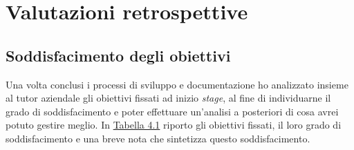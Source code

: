 
\chapter{Valutazioni retrospettive}
\label{cap:valutazioni-retrospettive}

\section{Soddisfacimento degli obiettivi}
Una volta conclusi i processi di sviluppo e documentazione ho analizzato insieme al tutor aziendale gli obiettivi fissati ad inizio \textit{stage}, al fine di individuarne il grado di soddisfacimento e poter effettuare un'analisi a posteriori di cosa avrei potuto gestire meglio. In \hyperref[tab:grado-soddisfacimento]{Tabella 4.1} riporto gli obiettivi fissati, il loro grado di soddisfacimento e una breve nota che sintetizza questo soddisfacimento. \\

